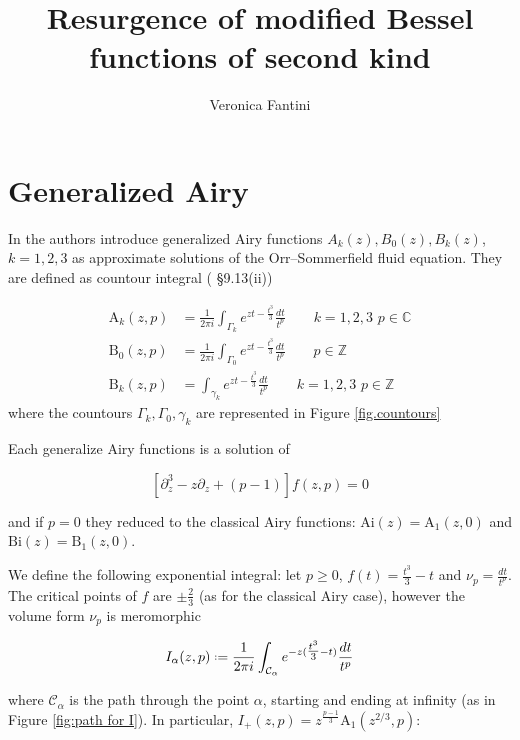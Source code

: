 \documentclass{article}
\title{Resurgence of modified Bessel functions of second kind}
\author{Veronica Fantini}
\newcommand{\Z}{\mathbb{Z}}
\newcommand{\C}{\mathbb{C}}
\begin{document}
\maketitle

\section{Generalized Airy}

In \cite{Reid} \cite{Drazin-Reid} the authors introduce generalized Airy functions $A_k(z), B_0(z), B_k(z)$, $k=1,2,3$ as approximate solutions of the Orr--Sommerfield fluid equation. They are defined as countour integral (\cite{DLMF} \S 9.13(ii))

\begin{align*}
\mathrm{A}_k(z,p)&=\frac{1}{2\pi i}\int_{\Gamma_k}e^{zt-\tfrac{t^3}{3}}\frac{dt}{t^p} \qquad k=1,2,3\,\, p\in\C \\
\mathrm{B}_0(z,p)&=\frac{1}{2\pi i}\int_{\Gamma_0}e^{zt-\tfrac{t^3}{3}}\frac{dt}{t^p} \qquad p\in\Z \\
\mathrm{B}_k(z,p)&=\int_{\gamma_k}e^{zt-\tfrac{t^3}{3}}\frac{dt}{t^p} \qquad k=1,2,3\,\, p\in\Z 
\end{align*}
where the countours $\Gamma_k, \Gamma_0, \gamma_k$ are represented in Figure \ref{fig.countours} 

\begin{figure}
\end{figure}

Each generalize Airy functions is a solution of

\begin{equation}
\left[\partial_z^3-z\partial_z+(p-1)\right]f(z,p)=0
\end{equation} 

and if $p=0$ they reduced to the classical Airy functions: $\mathrm{Ai}(z)=\mathrm{A}_1(z,0)$ and $\mathrm{Bi}(z)=\mathrm{B}_1(z,0)$.

We define the following exponential integral: let $p\geq 0$, $f(t)=\tfrac{t^3}{3}-t$ and $\nu_p=\tfrac{dt}{t^p}$. The critical points of $f$ are $\pm\tfrac{2}{3}$ (as for the classical Airy case), however the volume form $\nu_p$ is meromorphic    

\begin{equation}
I_\alpha(z,p)\defeq\frac{1}{2\pi i}\int_{\mathcal{C}_{\alpha}}e^{-z(\tfrac{t^3}{3}-t)}\frac{dt}{t^p}
\end{equation}

where $\mathcal{C}_\alpha$ is the path through the point $\alpha$, starting and ending at infinity (as in Figure \ref{fig:path for I}). In particular, $I_{+}(z,p)=z^{\tfrac{p-1}{3}}\mathrm{A}_1(z^{2/3},p)$: 
\end{document}
